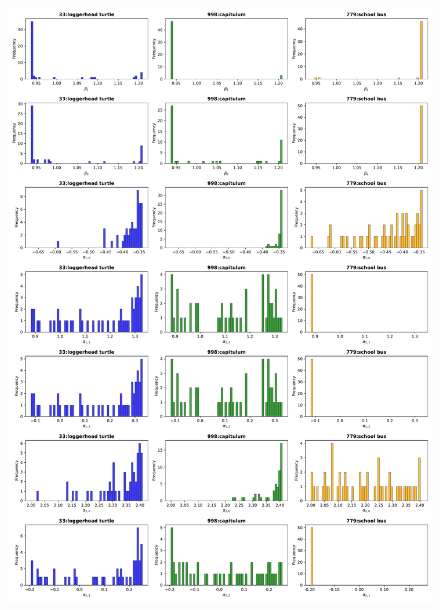 \begin{figure}[h]
    \begin{center}
    \includegraphics[width=1\textwidth]{fig/distribution_of_hc_final.pdf}
    \end{center}
  \caption{}
    \label{fig:vit_last_hc_distribution}
\end{figure}

